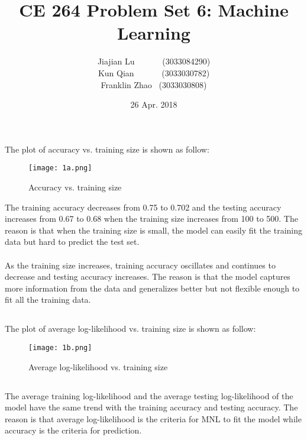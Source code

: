 \documentclass[11pt]{article}
\title{CE 264 Problem Set 6: Machine Learning}
\date{26 Apr. 2018}
\author{Jiajian Lu \ \ \ \ \ \ (3033084290)\\Kun Qian \ \ \ \ \ \ (3033030782)\\ Franklin Zhao \ (3033030808)}
\begin{document}
	
	\maketitle
	\renewcommand\theequation{\arabic{equation}}
	\renewcommand{\figurename}{Fig.}
	\renewcommand\thesection{Problem \arabic{section}}
	\renewcommand\thesubsection{\arabic{subsection})}
	\renewcommand\thesubsubsection{Question (\alph{subsubsection}):}
	\onehalfspacing	

\section{}
\subsection{}
The plot of accuracy vs. training size is shown as follow:
\begin{figure}[H]
	\centering
	\texttt{[image: 1a.png]}     
	\caption{Accuracy vs. training size}
\end{figure}
\noindent The training accuracy decreases from 0.75 to 0.702 and the testing accuracy increases from 0.67 to 0.68 when the training size increases from 100 to 500. The reason is that when the training size is small, the model can easily fit the training data but hard to predict the test set.\\\\ 
As the training size increases, training accuracy oscillates and continues to decrease and testing accuracy increases. The reason is that the model captures more information from the data and generalizes better but not flexible enough to fit all the training data.
\newpage
\subsection{}
The plot of average log-likelihood vs. training size is shown as follow:
\begin{figure}[H]
	\centering
	\texttt{[image: 1b.png]}     
	\caption{Average log-likelihood vs. training size}
\end{figure}
\subsection{}
The average training log-likelihood and the average testing log-likelihood of the model have the same trend with the training accuracy and testing accuracy. The reason is that average log-likelihood is the criteria for MNL to fit the model while accuracy is the criteria for prediction.
\end{document}
